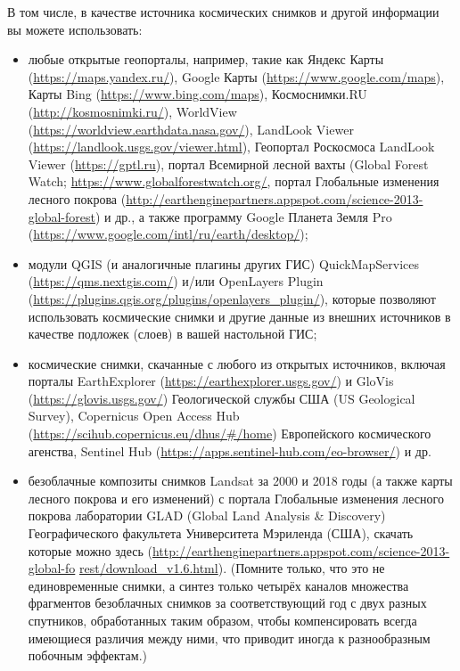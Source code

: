 В том числе, в качестве источника космических снимков и другой информации вы можете использовать:
\begin{itemize}
    \item любые открытые геопорталы, например, такие как  Яндекс Карты (\url{https://maps.yandex.ru/}), Google Карты (\url{https://www.google.com/maps}), Карты Bing (\url{https://www.bing.com/maps}), Космоснимки.RU (\url{http://kosmosnimki.ru/}), WorldView (\url{https://worldview.earthdata.nasa.gov/}), LandLook \linebreak Viewer (\url{https://landlook.usgs.gov/viewer.html}), Геопортал Роскосмоса \linebreak LandLook Viewer (\url{https://gptl.ru}), портал Всемирной лесной вахты (Global Forest Watch; \url{https://www.globalforestwatch.org/}, портал Глобальные изменения лесного покрова (\url{http://earthenginepartners.appspot.com/scien}\linebreak \url{ce-2013-global-forest}) и др., а также программу Google Планета Земля Pro (\url{https://www.google.com/intl/ru/earth/desktop/});
    \item модули QGIS (и аналогичные плагины других ГИС) QuickMapServices (\url{https://qms.nextgis.com/}) и/или OpenLayers Plugin (\url{https://plugins.qgis.org/plugins/openlayers_plugin/}), которые позволяют использовать космические снимки и другие данные из внешних источников в качестве подложек (слоев) в вашей настольной ГИС;
    \item космические снимки, скачанные с любого из открытых источников, включая порталы EarthExplorer (\url{https://earthexplorer.usgs.gov/}) и GloVis (\url{https://glovis.usgs.gov/}) Геологической службы США (US Geological Survey), Copernicus Open Access Hub (\url{https://scihub.copernicus.eu/dhus/#/home}) Европейского космического агенства, Sentinel Hub (\url{https://apps.sentinel-hub.com/eo-browser/}) и др.
    \item безоблачные композиты снимков Landsat за 2000 и 2018 годы (а также карты лесного покрова и его изменений) с портала Глобальные изменения лесного покрова лаборатории GLAD (Global Land Analysis \& Discovery) Географического факультета Университета Мэриленда (США), скачать которые можно здесь (\url{http://earthenginepartners.appspot.com/science-2013-global-fo} \linebreak \url{rest/download_v1.6.html}). (Помните только, что это не единовременные снимки, а синтез только четырёх каналов множества фрагментов безоблачных снимков за соответствующий год с двух разных спутников, обработанных таким образом, чтобы компенсировать всегда имеющиеся различия между ними, что приводит иногда к разнообразным побочным эффектам.)
\end{itemize}

